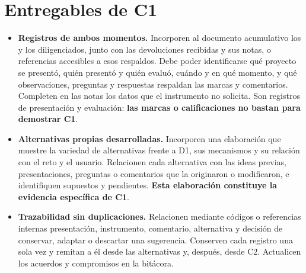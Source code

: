 \section*{Entregables de C1}
\begin{itemize}
\item \textbf{Registros de ambos momentos.} Incorporen al documento acumulativo los  y los  diligenciados, junto con las devoluciones recibidas y sus notas, o referencias accesibles a esos respaldos. Debe poder identificarse qué proyecto se presentó, quién presentó y quién evaluó, cuándo y en qué momento, y qué observaciones, preguntas y respuestas respaldan las marcas y comentarios. Completen en las notas los datos que el instrumento no solicita. Son registros de presentación y evaluación: \textbf{las marcas o calificaciones no bastan para demostrar C1}.
\item \textbf{Alternativas propias desarrolladas.} Incorporen una elaboración que muestre la variedad de alternativas frente a D1, sus mecanismos y su relación con el reto y el usuario. Relacionen cada alternativa con las ideas previas, presentaciones, preguntas o comentarios que la originaron o modificaron, e identifiquen supuestos y pendientes. \textbf{Esta elaboración constituye la evidencia específica de C1}.
\item \textbf{Trazabilidad sin duplicaciones.} Relacionen mediante códigos o referencias internas presentación, instrumento, comentario, alternativa y decisión de conservar, adaptar o descartar una sugerencia. Conserven cada registro una sola vez y remitan a él desde las alternativas y, después, desde C2. Actualicen los acuerdos y compromisos en la bitácora.
\end{itemize}


